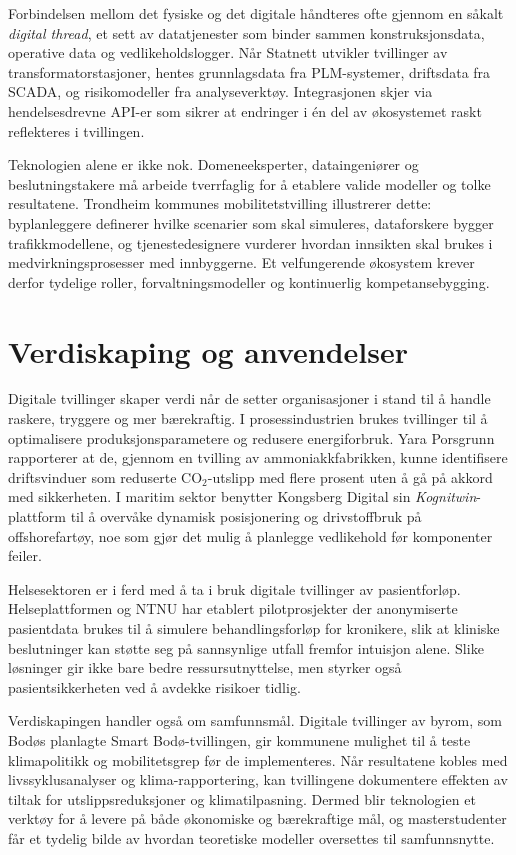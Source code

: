 Forbindelsen mellom det fysiske og det digitale håndteres ofte gjennom en såkalt \emph{digital thread}, et sett av datatjenester som binder sammen konstruksjonsdata, operative data og vedlikeholdslogger. Når Statnett utvikler tvillinger av transformatorstasjoner, hentes grunnlagsdata fra PLM-systemer, driftsdata fra SCADA, og risikomodeller fra analyseverktøy. Integrasjonen skjer via hendelsesdrevne API-er som sikrer at endringer i én del av økosystemet raskt reflekteres i tvillingen.

Teknologien alene er ikke nok. Domeneeksperter, dataingeniører og beslutningstakere må arbeide tverrfaglig for å etablere valide modeller og tolke resultatene. Trondheim kommunes mobilitetstvilling illustrerer dette: byplanleggere definerer hvilke scenarier som skal simuleres, dataforskere bygger trafikkmodellene, og tjenestedesignere vurderer hvordan innsikten skal brukes i medvirkningsprosesser med innbyggerne. Et velfungerende økosystem krever derfor tydelige roller, forvaltningsmodeller og kontinuerlig kompetansebygging.

\section{Verdiskaping og anvendelser}
Digitale tvillinger skaper verdi når de setter organisasjoner i stand til å handle raskere, tryggere og mer bærekraftig. I prosessindustrien brukes tvillinger til å optimalisere produksjonsparametere og redusere energiforbruk. Yara Porsgrunn rapporterer at de, gjennom en tvilling av ammoniakkfabrikken, kunne identifisere driftsvinduer som reduserte CO$_2$-utslipp med flere prosent uten å gå på akkord med sikkerheten. I maritim sektor benytter Kongsberg Digital sin \emph{Kognitwin}-plattform til å overvåke dynamisk posisjonering og drivstoffbruk på offshorefartøy, noe som gjør det mulig å planlegge vedlikehold før komponenter feiler.

Helsesektoren er i ferd med å ta i bruk digitale tvillinger av pasientforløp. Helseplattformen og NTNU har etablert pilotprosjekter der anonymiserte pasientdata brukes til å simulere behandlingsforløp for kronikere, slik at kliniske beslutninger kan støtte seg på sannsynlige utfall fremfor intuisjon alene. Slike løsninger gir ikke bare bedre ressursutnyttelse, men styrker også pasientsikkerheten ved å avdekke risikoer tidlig.

Verdiskapingen handler også om samfunnsmål. Digitale tvillinger av byrom, som Bodøs planlagte Smart Bodø-tvillingen, gir kommunene mulighet til å teste klimapolitikk og mobilitetsgrep før de implementeres. Når resultatene kobles med livssyklusanalyser og klima-rapportering, kan tvillingene dokumentere effekten av tiltak for utslippsreduksjoner og klimatilpasning. Dermed blir teknologien et verktøy for å levere på både økonomiske og bærekraftige mål, og masterstudenter får et tydelig bilde av hvordan teoretiske modeller oversettes til samfunnsnytte.

